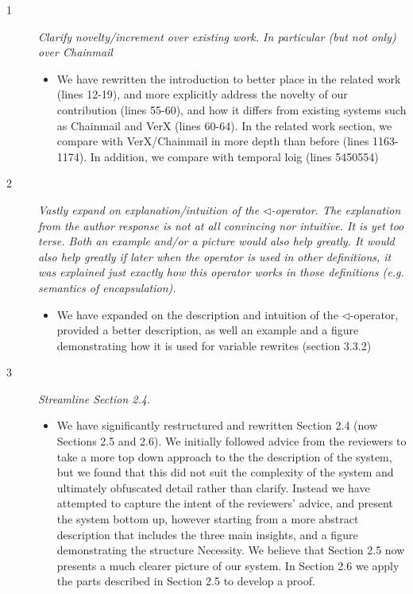 \documentclass[11pt]{amsart}
\begin{document}
 \begin{description}
 
 \item[1]
 \emph{Clarify novelty/increment over existing work. In particular (but not only) over Chainmail} 
 \begin{itemize}
 \item
 
  	We have rewritten the introduction to better place in the related work (lines 12-19),
	and more explicitly address the novelty of our contribution (lines 55-60), and how it differs from
  	existing systems such as Chainmail and VerX (lines 60-64). In the related work section,
	we compare with VerX/Chainmail in more depth than before (lines 1163-1174).
	In addition, we compare with temporal loig (lines 5450554)
  \end{itemize}
 
 \item[2]
 \emph{
 Vastly expand on explanation/intuition of the 
 $\triangleleft$-operator. The explanation from the author response is not at all 
 convincing nor intuitive. It is yet too terse. Both an example and/or a picture 
 would also help greatly. It would also help greatly if later when the operator is 
 used in other definitions, it was explained just exactly how this operator works 
 in those definitions (e.g. semantics of encapsulation).
 }
 \begin{itemize}
 \item
  	We have expanded on the description and intuition of the 
  	$\triangleleft$-operator, provided a better description, as well
  	an example and a figure demonstrating how it is used for variable rewrites (section 3.3.2)
 
 \end{itemize}
 
 \item[3]
 \emph{
 Streamline Section 2.4.
 }
 \begin{itemize}
 \item
  	We have significantly restructured and rewritten Section 2.4 (now Sections 2.5 and 2.6).
  	We initially followed advice from the reviewers to take a more
  	top down approach to the the description of the system, but we 
  	found that this did not suit the complexity of the system
  	and ultimately obfuscated detail rather than clarify. Instead 
  	we have attempted to capture the intent of the reviewers' 
  	advice, and present the system bottom up, however starting from 
  	a more abstract description that includes the three main insights, and 
	a figure demonstrating 
  	the structure Necessity.
  	We believe that Section 2.5 now presents a much clearer picture of our
  	system. In Section 2.6 we apply the parts described in Section 2.5 to develop a proof.
 

\end{itemize}
\end{description}
\end{document}
